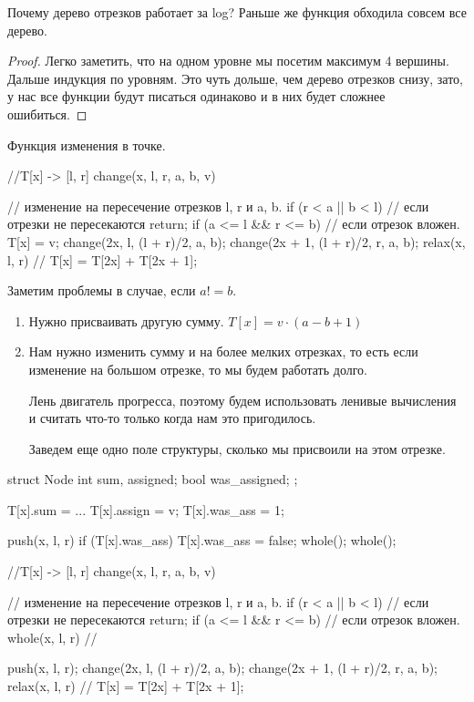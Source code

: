 Почему дерево отрезков работает за log? Раньше же функция обходила совсем все дерево. 

\begin{proof}
Легко заметить, что на одном уровне мы посетим максимум 4 вершины. Дальше индукция по уровням. Это чуть дольше,
чем дерево отрезков снизу, зато, у нас все функции будут писаться одинаково и в них будет сложнее ошибиться.  
\end{proof}

Функция изменения в точке. 
\begin{cppcode}
//T[x] -> [l, r]
change(x, l, r, a, b, v) { // изменение на пересечение отрезков l, r и a, b.
    if (r < a || b < l)  { // если  отрезки не пересекаются
        return;
    }
    if (a <= l && r <= b) { // если отрезок вложен. 
        T[x] = v;
    }
    change(2x, l, (l + r)/2, a, b);
    change(2x + 1, (l + r)/2, r, a, b);
    relax(x, l, r) // T[x] = T[2x] + T[2x + 1];

}
\end{cppcode}

Заметим проблемы в случае, если $a != b$. 
\begin{enumerate}
    \item Нужно присваивать другую сумму. 
    $T[x] = v \cdot (a - b + 1)$
    \item Нам нужно изменить сумму и на более мелких отрезках, 
    то есть если изменение на большом отрезке, то мы будем работать долго. 

    Лень двигатель прогресса, поэтому будем использовать ленивые вычисления и считать что-то только когда нам это пригодилось. 

    Заведем еще одно поле структуры, сколько мы присвоили на этом отрезке. 
\end{enumerate}


\begin{cppcode}
struct Node{ 
    int sum, assigned;
    bool was_assigned;
};

T[x].sum = ...
T[x].assign = v;
T[x].was_ass = 1;
\end{cppcode}

\begin{cppcode}
push(x, l, r) {
    if (T[x].was_ass) {
        T[x].was_ass = false;
        whole();
        whole();
    }
}

//T[x] -> [l, r]
change(x, l, r, a, b, v) { // изменение на пересечение отрезков l, r и a, b.
    if (r < a || b < l)  { // если  отрезки не пересекаются
        return;
    }
    if (a <= l && r <= b) { // если отрезок вложен. 
        whole(x, l, r) //
    }

    push(x, l, r);
    change(2x, l, (l + r)/2, a, b);
    change(2x + 1, (l + r)/2, r, a, b);
    relax(x, l, r) // T[x] = T[2x] + T[2x + 1];
}
\end{cppcode}

